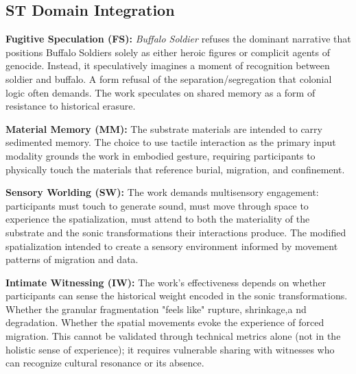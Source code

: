 \subsection{ST Domain Integration}

\textbf{Fugitive Speculation (FS):} \emph{Buffalo Soldier} refuses the dominant narrative that positions Buffalo Soldiers solely as either heroic figures or complicit agents of genocide. Instead, it speculatively imagines a moment of recognition between soldier and buffalo. A form refusal of the separation/segregation that colonial logic often demands. The work speculates on shared memory as a form of resistance to historical erasure.

\textbf{Material Memory (MM):} The substrate materials are intended to carry sedimented memory. The choice to use tactile interaction as the primary input modality grounds the work in embodied gesture, requiring participants to physically touch the materials that reference burial, migration, and confinement.

\textbf{Sensory Worlding (SW):} The work demands multisensory engagement: participants must touch to generate sound, must move through space to experience the spatialization, must attend to both the materiality of the substrate and the sonic transformations their interactions produce. The modified spatialization intended to create a sensory environment informed by movement patterns of migration and data.

\textbf{Intimate Witnessing (IW):} The work's effectiveness depends on whether participants can sense the historical weight encoded in the sonic transformations. Whether the granular fragmentation "feels like" rupture, shrinkage,a nd degradation. Whether the spatial movements evoke the experience of forced migration. This cannot be validated through technical metrics alone (not in the holistic sense of experience); it requires vulnerable sharing with witnesses who can recognize cultural resonance or its absence.